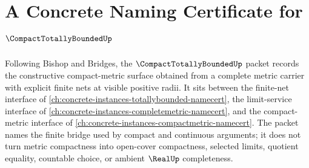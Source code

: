 \chapter{A Concrete Naming Certificate for $\CompactTotallyBoundedUp$}
\label{ch:concrete-instances-compact-totally-bounded-namecert}

Following Bishop and Bridges, the $\CompactTotallyBoundedUp$ packet records the constructive compact-metric surface obtained from a complete metric carrier with explicit finite nets at visible positive radii. It sits between the finite-net interface of \autoref{ch:concrete-instances-totallybounded-namecert}, the limit-service interface of \autoref{ch:concrete-instances-completemetric-namecert}, and the compact-metric interface of \autoref{ch:concrete-instances-compactmetric-namecert}. The packet names the finite bridge used by compact and continuous arguments; it does not turn metric compactness into open-cover compactness, selected limits, quotient equality, countable choice, or ambient $\RealUp$ completeness.

